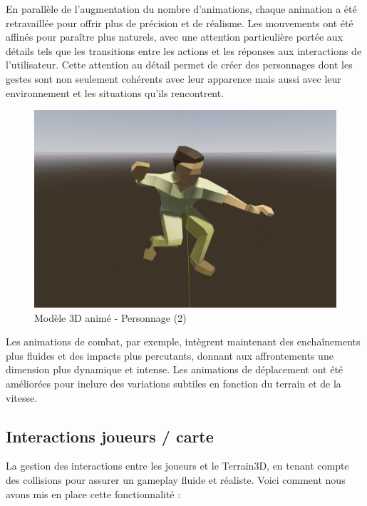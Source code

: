 \documentclass[
	article,			%
	11pt,				%
	oneside,			%
	a4paper,			%
	chapter=TITLE,
	french,			%
	sumario=tradicional
	]{base_nt}
\begin{document}
\newpage

En parallèle de l'augmentation du nombre d'animations, chaque animation a été retravaillée pour offrir plus de précision et de réalisme. Les mouvements ont été affinés pour paraître plus naturels, avec une attention particulière portée aux détails tels que les transitions entre les actions et les réponses aux interactions de l'utilisateur. Cette attention au détail permet de créer des personnages dont les gestes sont non seulement cohérents avec leur apparence mais aussi avec leur environnement et les situations qu'ils rencontrent.

\newpage

\begin{figure}[ht]
	\caption{Modèle 3D animé - Personnage (2)}
	\centering
	\includegraphics[width=1\linewidth]{paper16.png}
	\legend{}
	
\end{figure}

Les animations de combat, par exemple, intègrent maintenant des enchaînements plus fluides et des impacts plus percutants, donnant aux affrontements une dimension plus dynamique et intense. Les animations de déplacement ont été améliorées pour inclure des variations subtiles en fonction du terrain et de la vitesse.

\newpage

\vspace{0cm}

\subsection{Interactions joueurs / carte}


La gestion des interactions entre les joueurs et le Terrain3D, en tenant compte des collisions pour assurer un gameplay fluide et réaliste. Voici comment nous avons mis en place cette fonctionnalité :
\end{document}
